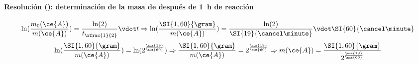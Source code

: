 \begin{frame}
	\frametitle{\ejerciciocmd}
	\framesubtitle{Resolución (): determinación de la masa de  después de \SI{1}{\hour} de reacción}
	\begin{overprint}
			$$
				\ln(\frac{m_0(\ce{A})}{m(\ce{A})})=\frac{\ln(2)}{t_{\rfrac{1}{2}}}\vdot t\Rightarrow
				\ln(\frac{\SI{1,60}{\gram}}{m(\ce{A})})=\frac{\ln(2)}{\SI{19}{\cancel\minute}}\vdot\SI{60}{\cancel\minute}
			$$
		\onslide<2->
			$$
				\ln(\frac{\SI{1,60}{\gram}}{m(\ce{A})})=\ln(2^{\frac{\num{19}}{\num{60}}})\Rightarrow
				\frac{\SI{1,60}{\gram}}{m(\ce{A})}=2^{\frac{\num{19}}{\num{60}}}\Rightarrow
				m(\ce{A})=\frac{\SI{1,60}{\gram}}{2^{\frac{\num{19}}{\num{60}}}}
			$$
	\end{overprint}
\end{frame}

